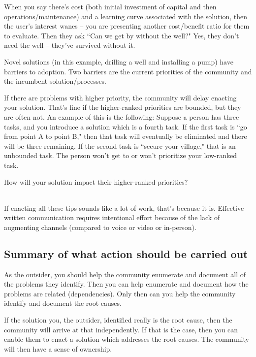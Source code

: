 When you say there's cost (both initial investment of capital and then operations/maintenance) and a learning curve associated with the solution, then the user's interest wanes -- you are presenting another cost/benefit ratio for them to evaluate. Then they ask ``Can we get by without the well?" Yes, they don't need the well -- they've survived without it.

Novel solutions (in this example, drilling a well and installing a pump) have barriers to adoption. Two barriers are the current priorities of the community and the incumbent solution/processes.

If there are problems with higher priority, the community will delay enacting your solution. That's fine if the higher-ranked priorities are bounded, but they are often not. An example of this is the following:
Suppose a person has three tasks, and you introduce a solution which is a fourth task.
If the first task is ``go from point A to point B," then that task will eventually be eliminated and there will be three remaining.
If the second task is ``secure your village," that is an unbounded task. The person won't get to or won't prioritize your low-ranked task.

How will your solution impact their higher-ranked priorities?

\ \\

If enacting all these tips sounds like a lot of work, that's because it is. Effective written communication requires intentional effort because of the lack of augmenting channels (compared to voice or video or in-person). 




\subsection*{Summary of what action should be carried out} 

As the outsider, you should help the community enumerate and document all of the problems they identify. Then you can help enumerate and document how the problems are related (dependencies). Only then can you help the community identify and document the root causes.

If the solution you, the outsider, identified really is the root cause, then the community will arrive at that independently. If that is the case, then you can enable them to enact a solution which addresses the root causes. The community will then have a sense of ownership.
